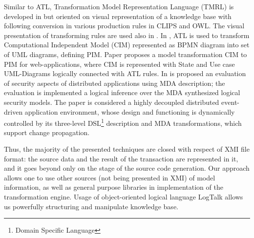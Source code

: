 \documentclass[conference]{IEEEtran} \IEEEoverridecommandlockouts
\begin{document}
Similar to ATL, Transformation Model Representation Language (TMRL) is developed in \cite{nikita} but oriented on visual representation of a knowledge base with following conversion in various production rules in CLIPS and OWL. The visual presentation of transforming rules are used also in \cite{GT}. In \cite{azis}, ATL is used to transform Computational Independent Model (CIM) represented as BPMN diagram into set of UML diagrams, defining PIM. Paper \cite{Rhazali} proposes a model transformation CIM to PIM for web-applications, where CIM is represented with State and Use case UML-Diagrams logically connected with ATL rules. In \cite{Hamid} is proposed an evaluation of security aspects of distributed applications using MDA description; the evaluation is implemented a logical inference over the MDA synthesized logical security models. The paper \cite{Zdun} is considered a highly decoupled distributed event-driven application environment, whose design and functioning is dynamically controlled by its three-level DSL\footnote{Domain Specific Language} description and MDA transformations, which support change propagation. 

Thus, the majority of the presented techniques are closed with respect of XMI file format: the source data and the result of the transaction are represented in it, and it goes beyond only on the stage of the source code generation. Our approach allows one to use other sources (not being presented in XMI) of model information, as well as general purpose libraries in implementation of the transformation engine. Usage of object-oriented logical language LogTalk allows us powerfully structuring and manipulate knowledge base. 
\end{document}
